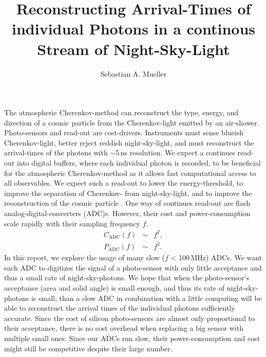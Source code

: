 \documentclass{article}%
\title{
    Reconstructing Arrival-Times of individual Photons
    in a continous Stream of Night-Sky-Light
}%
\author{Sebastian A. Mueller}%
\date{}%
\begin{document}
%
\maketitle%

\newcommand{\F}{F_\text{night-sky-background}}
\newcommand{\Ftyp}{F_\text{dark-night}}
\begin{multicols}{2}%
%
The atmospheric Cherenkov-method can reconstruct the type, energy, and direction of a cosmic particle from the Cherenkov-light emitted by an air-shower.
%
Photo-sensors and read-out are cost-drivers.
%
Instruments must sense blueish Cherenkov-light, better reject reddish night-sky-light, and must reconstruct the arrival-times of the photons with $\sim{}$5\,ns resolution.
\newline
%
We expect a continues read-out into digital buffers, where each individual photon is recorded, to be beneficial for the atmospheric Cherenkov-method as it allows fast computational access to all observables.
%
We expect such a read-out to lower the energy-threshold, to improve the separation of Cherenkov- from night-sky-light, and to improve the reconstruction of the cosmic particle \cite{jung2005star,catalano2008single}.
\newline
%
One way of continues read-out are flash analog-digital-converters (ADC)s.
%
However, their cost and power-consumption scale rapidly with their sampling frequency $f$.
%
\begin{eqnarray*}
C_\text{ADC}(f) &\sim& f^2,\\
P_\text{ADC}(f) &\sim& f^2.
\end{eqnarray*}
%
In this report, we explore the usage of many slow ($f$ < 100\,MHz) ADCs.
%
We want each ADC to digitizes the signal of a photo-sensor with only little acceptance and thus a small rate of night-sky-photons.
%
We hope that when the photo-sensor's acceptance (area and solid angle) is small enough, and thus its rate of night-sky-photons is small, than a slow ADC in combination with a little computing will be able to reconstruct the arrival times of the individual photons sufficiently accurate.
%
Since the cost of silicon photo-sensors are almost only proportional to their acceptance, there is no cost overhead when replacing a big sensor with multiple small ones.
%
Since our ADCs run slow, their power-consumption and cost might still be competitive despite their large number.
%

\end{multicols}
\end{document}
